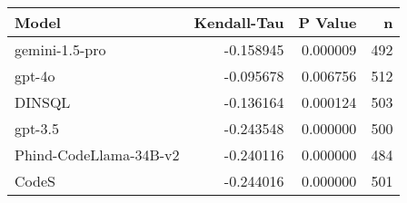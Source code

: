 \begin{tabular}{lrrr}
\toprule
Model & Kendall-Tau & P Value & n \\
\midrule
gemini-1.5-pro & -0.158945 & 0.000009 & 492 \\
gpt-4o & -0.095678 & 0.006756 & 512 \\
DINSQL & -0.136164 & 0.000124 & 503 \\
gpt-3.5 & -0.243548 & 0.000000 & 500 \\
Phind-CodeLlama-34B-v2 & -0.240116 & 0.000000 & 484 \\
CodeS & -0.244016 & 0.000000 & 501 \\
\bottomrule
\end{tabular}
